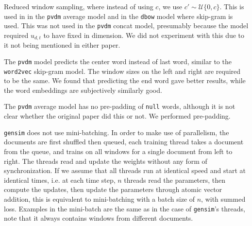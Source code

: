\documentclass{article}
\begin{document}
\begin{appendices}
Reduced window sampling, where instead of using $c$, we use $c'\sim\mathcal{U}\{0,c\}$. This is used in in the \texttt{pvdm} average model and in the \texttt{dbow} model where skip-gram is used. This was not used in the \texttt{pvdm} concat model, presumably because the model required $u_{d,t}$ to have fixed in dimension. We did not experiment with this due to it not being mentioned in either paper.

The \texttt{pvdm} model predicts the center word instead of last word, similar to the \texttt{word2vec} skip-gram model. The window sizes on the left and right are required to be the same. We found that predicting the end word gave better results, while the word embeddings are subjectively similarly good.

The \texttt{pvdm} average model has no pre-padding of \texttt{null} words, although it is not clear whether the original paper did this or not. We performed pre-padding.

\texttt{gensim} does not use mini-batching. In order to make use of parallelism, the documents are first shuffled then queued, each training thread takes a document from the queue, and trains on all windows for a single document from left to right. The threads read and update the weights without any form of synchronization. If we assume that all threads run at identical speed and start at identical times, i.e. at each time step, $n$ threads read the parameters, then compute the updates, then update the parameters through atomic vector addition, this is equivalent to mini-batching with a batch size of $n$, with summed loss. Examples in the mini-batch are the same as in the case of \texttt{gensim}'s threads, note that it always contains windows from different documents.

\end{appendices}

{}

\end{document}
